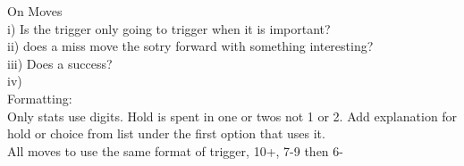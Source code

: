 \documentclass{tufte-book}
\begin{document}
On Moves\\
i) Is the trigger only going to trigger when it is important?\\
ii) does a miss move the sotry forward with something interesting?\\
iii) Does a success?\\
iv) \\

Formatting:\\
Only stats use digits. Hold is spent in one or twos not 1 or 2. Add explanation for hold or choice from list under the first option that uses it.\\
All moves to use the same format of trigger, 10+, 7-9 then 6-\\









\backmatter




\printindex[stuff]

\printindex
\end{document}
